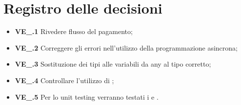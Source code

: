 \section{Registro delle decisioni}
\begin{itemize}
	\item \textbf{VE\_\Data.1} Rivedere flusso del pagamento;
	\item \textbf{VE\_\Data.2} Correggere gli errori nell'utilizzo della programmazione asincrona;
	\item \textbf{VE\_\Data.3} Sostituzione dei tipi alle variabili da any al tipo corretto;
	\item \textbf{VE\_\Data.4} Controllare l'utilizzo di ;
	\item \textbf{VE\_\Data.5} Per lo unit testing verranno testati i   e .
\end{itemize}
